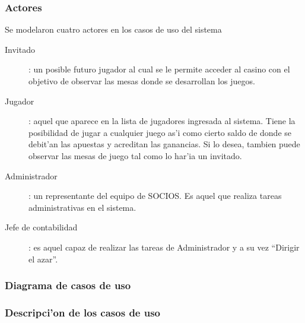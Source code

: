 \subsubsection{Actores}
Se modelaron cuatro actores en los casos de uso del sistema

\begin{description}
\item[Invitado]: un posible futuro jugador al cual se le permite acceder al casino con el objetivo de observar las mesas donde se desarrollan los juegos.
\item[Jugador]: aquel que aparece en la lista de jugadores ingresada al sistema. Tiene la posibilidad de jugar a cualquier juego as'i como cierto saldo de donde se debit'an las apuestas y acreditan las ganancias. Si lo desea, tambien puede observar las mesas de juego tal como lo har'ia un invitado.
\item[Administrador]: un representante del equipo de SOCIOS. Es aquel que realiza tareas administrativas en el sistema.
\item[Jefe de contabilidad]: es aquel capaz de realizar las tareas de Administrador y a su vez ``Dirigir el azar''.
\end{description}


\clearpage
\subsubsection{Diagrama de casos de uso}




\subsubsection{Descripci'on de los casos de uso}








